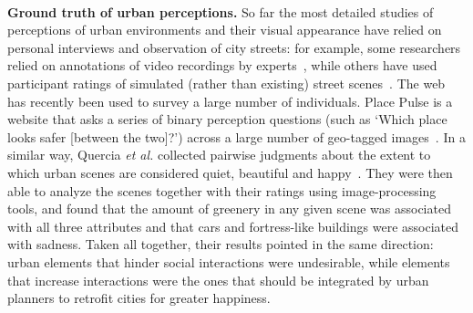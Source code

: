 \mbox{}\\
\noindent
\textbf{Ground truth of urban perceptions.} So far the most detailed studies of perceptions of urban environments and their visual appearance have relied on personal interviews and observation of city streets: for example, some researchers relied on annotations of video recordings by experts~\cite{sampson04seeing}, while others have used participant ratings of simulated (rather than existing) street scenes~\cite{lindal2012}. The web has recently been used to survey a large number of individuals. Place Pulse is a website that asks a series of binary perception questions (such as `Which place looks safer [between the two]?') across a large number of geo-tagged images~\cite{salesses2013collaborative}. In a similar way, Quercia \emph{et al.} collected pairwise judgments about the extent to which urban scenes are considered quiet, beautiful and happy~\cite{quercia2014aesthetic}. They were then able to analyze the scenes together with their ratings using image-processing tools, and found that the amount of greenery in any given scene was associated with all three attributes and that cars and fortress-like buildings were associated with sadness. Taken all together, their results pointed in the same direction: urban elements that hinder social interactions were undesirable, while elements that increase interactions were the ones that should be integrated by urban planners to retrofit cities for greater happiness.
\mbox{}\\

